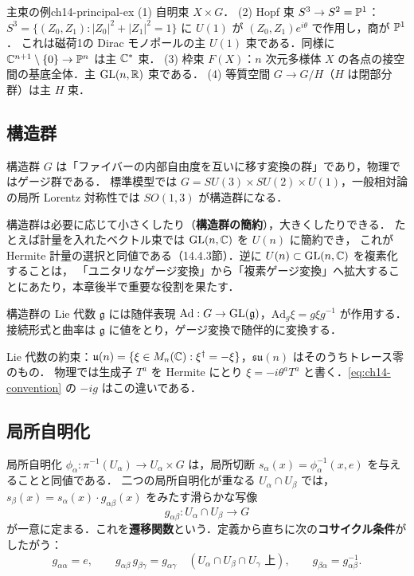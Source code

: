\begin{myex}{主束の例}{ch14-principal-ex}
(1) 自明束 $X\times G$．
(2) Hopf 束 $S^3\to S^2=\mathbb{P}^1$：$S^3=\{(Z_0,Z_1):|Z_0|^2+|Z_1|^2=1\}$ に $U(1)$ が $(Z_0,Z_1)e^{i\theta}$ で作用し，商が $\mathbb{P}^1$．
これは磁荷1の Dirac モノポールの主 $U(1)$ 束である．同様に $\mathbb{C}^{n+1}\setminus\{0\}\to\mathbb{P}^n$ は主 $\mathbb{C}^*$ 束．
(3) 枠束 $F(X)$：$n$ 次元多様体 $X$ の各点の接空間の基底全体．主 $\operatorname{GL}(n,\mathbb{R})$ 束である．
(4) 等質空間 $G\to G/H$（$H$ は閉部分群）は主 $H$ 束．
\end{myex}

\subsection{構造群}

構造群 $G$ は「ファイバーの内部自由度を互いに移す変換の群」であり，物理ではゲージ群である．
標準模型では $G=SU(3)\times SU(2)\times U(1)$，一般相対論の局所 Lorentz 対称性では $SO(1,3)$ が構造群になる．

構造群は必要に応じて小さくしたり（\textbf{構造群の簡約}），大きくしたりできる．
たとえば計量を入れたベクトル束では $\operatorname{GL}(n,\mathbb{C})$ を $U(n)$ に簡約でき，
これが Hermite 計量の選択と同値である（14.4.3節）．逆に $U(n)\subset\operatorname{GL}(n,\mathbb{C})$ を複素化することは，
「ユニタリなゲージ変換」から「複素ゲージ変換」へ拡大することにあたり，本章後半で重要な役割を果たす．

構造群の Lie 代数 $\mathfrak{g}$ には随伴表現 $\mathrm{Ad}:G\to\operatorname{GL}(\mathfrak{g})$，$\mathrm{Ad}_g\xi = g\xi g^{-1}$ が作用する．
接続形式と曲率は $\mathfrak{g}$ に値をとり，ゲージ変換で随伴的に変換する．
\begin{note}
Lie 代数の約束：$\mathfrak{u}(n)=\{\xi\in M_n(\mathbb{C}):\xi^\dagger=-\xi\}$，$\mathfrak{su}(n)$ はそのうちトレース零のもの．
物理では生成子 $T^a$ を Hermite にとり $\xi = -i\theta^aT^a$ と書く．\eqref{eq:ch14-convention} の $-ig$ はこの違いである．
\end{note}

\subsection{局所自明化}

局所自明化 $\phi_\alpha:\pi^{-1}(U_\alpha)\to U_\alpha\times G$ は，局所切断 $s_\alpha(x)=\phi_\alpha^{-1}(x,e)$ を与えることと同値である．
二つの局所自明化が重なる $U_\alpha\cap U_\beta$ では，$s_\beta(x) = s_\alpha(x)\cdot g_{\alpha\beta}(x)$ をみたす滑らかな写像
\begin{equation}
  g_{\alpha\beta}:U_\alpha\cap U_\beta\to G
\end{equation}
が一意に定まる．これを\textbf{遷移関数}という．定義から直ちに次の\textbf{コサイクル条件}がしたがう：
\begin{equation}
  g_{\alpha\alpha}=e,\qquad g_{\alpha\beta}\,g_{\beta\gamma} = g_{\alpha\gamma}\quad (U_\alpha\cap U_\beta\cap U_\gamma \text{ 上}),
  \qquad g_{\beta\alpha} = g_{\alpha\beta}^{-1}.
  \label{eq:ch14-cocycle}
\end{equation}

